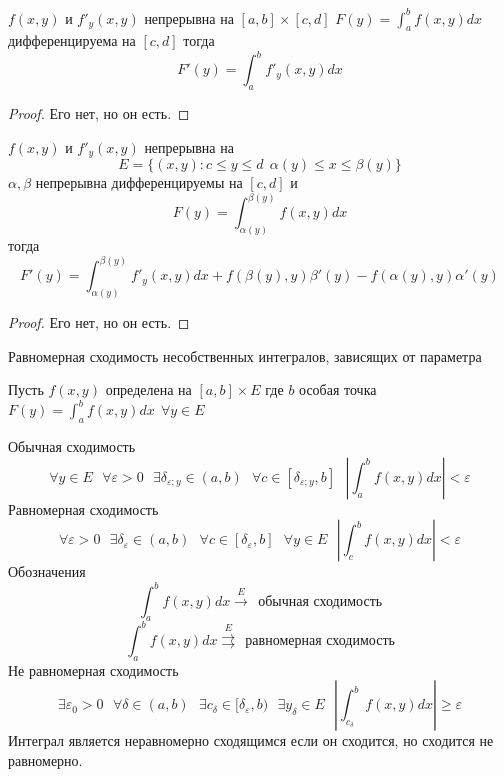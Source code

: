 \begin{theorem}
  $f(x,y)$ и $f'_y(x,y)$ непрерывна на $[a,b] \times [c,d]$ $F(y) = \int_a^b
  f(x,y)dx$ дифференцируема на $[c,d]$ тогда
  $$
  F'(y) = \int_a^b f'_y(x,y) dx
  $$
\end{theorem}

\begin{proof}
  Его нет, но он есть.
\end{proof}

\begin{theorem}
  $f(x,y)$ и $f'_y(x,y)$ непрерывна на
  $$
  E = \{ (x,y): c \le y \le d ~~ \alpha(y) \le x \le \beta(y) \}
  $$
  $\alpha, \beta$ непрерывна дифференцируемы на $[c,d]$ и
  $$
  F(y) = \int_{\alpha(y)}^{\beta(y)} f(x,y) dx
  $$
  тогда
  $$
  F'(y) = \int_{\alpha(y)}^{\beta(y)} f'_y(x,y)dx + f(\beta(y), y) \beta'(y) -
  f(\alpha(y), y) \alpha'(y)
  $$
\end{theorem}

\begin{proof}
  Его нет, но он есть.
\end{proof}

\begin{title}[\Large]
  Равномерная сходимость несобственных интегралов, зависящих от параметра
\end{title}

\begin{define}
  Пусть $f(x,y)$ определена на $[a,b] \times E$ где $b$ особая точка
  $F(y) = \int_a^b f(x,y) dx ~~ \forall y \in E$

  Обычная сходимость
  $$
  \forall y \in E
  ~~~
  \forall \varepsilon > 0
  ~~~
  \exists \delta_{\varepsilon; y} \in (a, b)
  ~~~
  \forall c \in [\delta_{\varepsilon; y}, b]
  ~~~
  \left|
    \int_a^b f(x,y) dx
  \right|
  < \varepsilon
  $$
  Равномерная сходимость
  $$
  \forall \varepsilon > 0
  ~~~
  \exists \delta_{\varepsilon} \in (a,b)
  ~~~
  \forall c \in [\delta_{\varepsilon}, b]
  ~~~
  \forall y \in E
  ~~~
  \left|
    \int_c^b f(x,y) dx
  \right|
  < \varepsilon
  $$
  Обозначения
  $$
  \int_a^b f(x,y) dx \stackrel{E}{\to} ~~ \text{обычная сходимость}
  $$
  $$
  \int_a^b f(x,y) dx \stackrel{E}{\rightrightarrows} ~~
  \text{равномерная сходимость}
  $$
  Не равномерная сходимость
  $$
  \exists \varepsilon_0 > 0
  ~~~
  \forall \delta \in (a,b)
  ~~~
  \exists c_{\delta} \in [\delta_{\varepsilon}, b)
  ~~~
  \exists y_{\delta} \in E
  ~~~
  \left|
    \int_{c_{\delta}}^b f(x,y) dx
  \right|
  \ge \varepsilon
  $$
  Интеграл является неравномерно сходящимся если он сходится, но сходится не
  равномерно.
\end{define}

